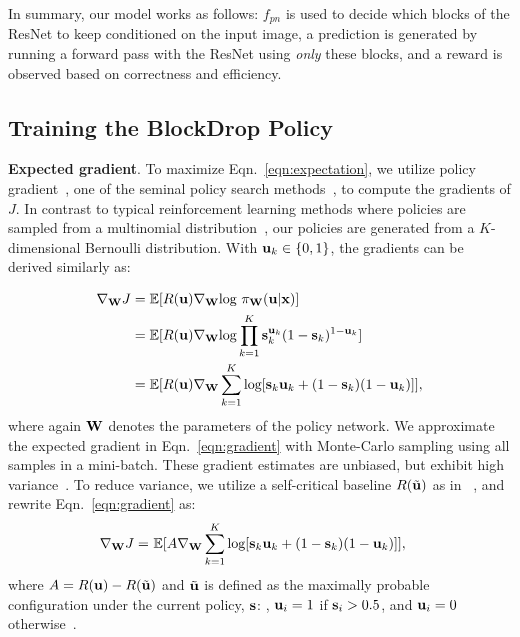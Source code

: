 \documentclass[10pt,twocolumn,letterpaper]{article}
\begin{document}
In summary, our model works as follows: $f_{pn}$ is used to decide which blocks of the ResNet to keep conditioned on the input image, a prediction is generated by running a forward pass with the ResNet using \emph{only} these blocks, and a reward is observed based on correctness and efficiency.


\subsection{Training the BlockDrop Policy}\label{sec:training}\noindent\textbf{Expected gradient}. To maximize Eqn.~\ref{eqn:expectation},  we utilize policy gradient~\cite{sutton1998reinforcement}, one of the seminal policy search methods~\cite{deisenroth2013survey}, to compute the gradients of $J$. In contrast to typical reinforcement learning methods where policies are sampled from a multinomial distribution~\cite{sutton1998reinforcement},  our policies are generated from a $K$-dimensional Bernoulli distribution. With ${\bf u}_k \in \{0,1\}$, the gradients can be derived similarly as:

\begin{align}
\nabla_{{\bf W}} J & =  \mathbb{E}[ R({\bf u})\nabla_{{\bf W}}\text{log}~\pi_{{\bf W}}({\bf u}|{\bf x})]\notag\\
&  = \mathbb{E}[ R({\bf u})\nabla_{{\bf W}} \text{log}\prod_{k=1}^{K} {\bf s}_k^{{\bf u}_k}(1-{\bf s}_k)^{1-{\bf u}_k}]\notag\\
& =  \mathbb{E}[ R({\bf u})\nabla_{{\bf W}} \sum_{k=1}^{K} \text{log} [{\bf s}_k{{\bf u}_k} + (1-{\bf s}_k)({1-{\bf u}_k})]],
\label{eqn:gradient}
\end{align}
where again ${\bf W}$ denotes the parameters of the policy network. We approximate the expected gradient in Eqn.~\ref{eqn:gradient} with Monte-Carlo sampling using all samples in a mini-batch. 
These gradient estimates are unbiased, but exhibit high variance~\cite{sutton1998reinforcement}. To reduce variance, we utilize a self-critical baseline $R(\tilde{{\bf u}})$ as in~\cite{rennie2016self} , and rewrite Eqn.~\ref{eqn:gradient} as:
\begin{align}
\label{eqn:finalgradient}
\nabla_{{\bf W}} J = ~& \mathbb{E}[A\nabla_{{\bf W}} \sum_{k=1}^{K} \text{log} [{\bf s}_k{{\bf u}_k} + (1-{\bf s}_k)({1-{\bf u}_k})]], 
\end{align}
where $A=R({\bf u})-R(\tilde{{\bf u}})$ and $\tilde{{\bf u}}$ is defined as the maximally probable configuration under the current policy, ${\bf s}$: \ie, ${\bf u}_i = 1$ if ${\bf s}_i> 0.5$, and ${\bf u}_i=0$ otherwise~\cite{rennie2016self}.
\end{document}
